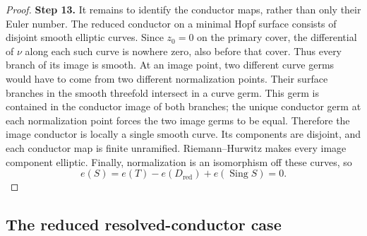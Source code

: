 \begin{proof}
\noindent\textbf{Step 13.} It remains to identify the conductor maps,
rather than only their Euler number.
The reduced conductor on a minimal Hopf
surface consists of disjoint smooth elliptic
curves. Since $z_0=0$ on the primary cover,
the differential of $\nu$ along each such
curve is nowhere zero, also before that
cover. Thus every branch of its image is
smooth. At an image point, two different
curve germs would have to come from two
different normalization points. Their
surface branches in the smooth threefold
intersect in a curve germ. This germ is
contained in the conductor image of both
branches; the unique conductor germ at
each normalization point forces the two
image germs to be equal. Therefore the
image conductor is locally a single smooth
curve. Its components are disjoint, and
each conductor map is finite unramified.
Riemann--Hurwitz makes every image component
elliptic. Finally, normalization is an
isomorphism off these curves, so
\[
 e(S)=e(T)-e(D_{\mathrm{red}})
                 +e(\operatorname{Sing}S)=0.
\]
\end{proof}


\subsection{The reduced resolved-conductor case}

